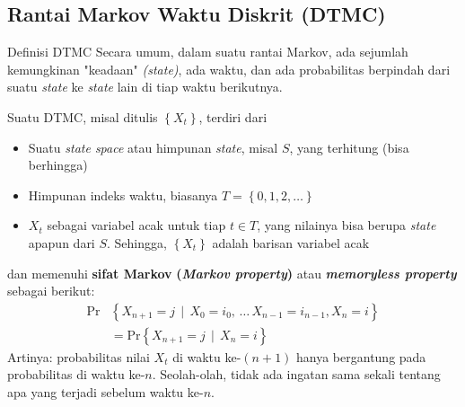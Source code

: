 \documentclass{beamer}
\newcommand{\pars}[1]{\left(#1\right)}
\newcommand{\braces}[1]{\left\{#1\right\}}
\begin{document}
\subsection{Rantai Markov Waktu Diskrit (DTMC)}

\begin{frame}{Definisi DTMC}
    Secara umum, dalam suatu rantai Markov, ada sejumlah kemungkinan "keadaan" \textit{(state)}, ada waktu, dan ada probabilitas berpindah dari suatu \textit{state} ke \textit{state} lain di tiap waktu berikutnya.

    Suatu DTMC, misal ditulis \( \braces{X_t} \), terdiri dari
    \begin{itemize}
        \item Suatu \textit{state space} atau himpunan \textit{state}, misal \( S \), 
        yang terhitung (bisa berhingga)
        \item Himpunan indeks waktu, biasanya \( T = \braces{0, 1, 2, \dots} \)
        \item $X_t$ sebagai variabel acak untuk tiap \( t \in T \), yang nilainya bisa berupa \textit{state} apapun dari \( S \). Sehingga, \( \braces{X_t} \) adalah barisan variabel acak
    \end{itemize}
    dan memenuhi \textbf{sifat Markov} \textbf{(\textit{Markov property})} atau \textbf{\textit{memoryless property}} sebagai berikut:
    \begin{align*}
        \text{Pr}&\braces{X_{n+1} = j \, \mid \, X_0 = i_0, \, \dots \, X_{n-1} = i_{n-1}, X_n = i} \\
        &= \text{Pr}\braces{X_{n+1} = j \, \mid \, X_n = i}
    \end{align*}
    Artinya: probabilitas nilai \( X_t \) di waktu ke-\(\pars{n+1}\) hanya bergantung pada probabilitas di waktu ke-\(n\). Seolah-olah, tidak ada ingatan sama sekali tentang apa yang terjadi sebelum waktu ke-\(n\).

\end{frame}
\end{document}
